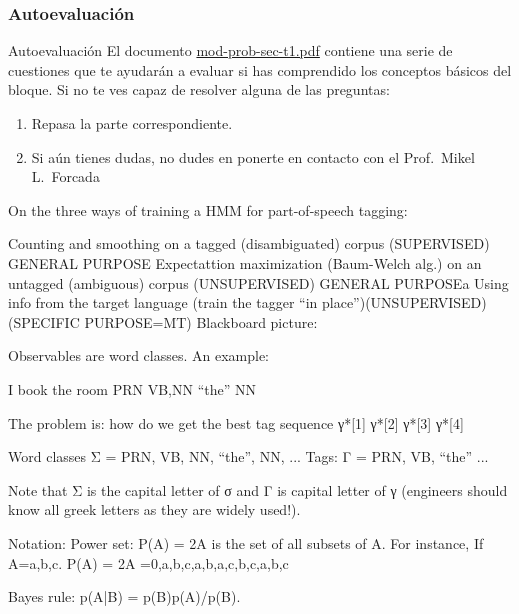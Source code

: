 \begin{frame}
\frametitle{Autoevaluación}

\begin{block}{Autoevaluación}
  El documento \url{mod-prob-sec-t1.pdf} contiene una serie de
  cuestiones que te ayudarán a evaluar si has comprendido los
  conceptos básicos del bloque. Si no te ves capaz de resolver alguna
  de las preguntas:
\begin{enumerate}
\item Repasa la parte correspondiente.
\item Si aún tienes dudas, no dudes en ponerte en contacto con el Prof.\ Mikel L.\ Forcada
\end{enumerate}
\end{block}

  
\end{frame}



















On the three ways of training a HMM for part-of-speech tagging:

Counting and smoothing on a tagged (disambiguated) corpus (SUPERVISED) GENERAL PURPOSE
Expectattion maximization (Baum-Welch alg.) on an untagged (ambiguous) corpus (UNSUPERVISED) GENERAL PURPOSEa
Using info from the target language (train the tagger “in place”)(UNSUPERVISED) (SPECIFIC PURPOSE=MT)
Blackboard picture:


Observables are word classes. An example:

I book the room
{PRN} {VB,NN} “the” {NN}

The problem is: how do we get the best tag sequence γ*[1] γ*[2] γ*[3] γ*[4]

Word classes Σ = { {PRN}, {VB, NN}, “the”, {NN}, ...}
Tags: Γ = { PRN, VB, “the” ...}

Note that Σ is the capital letter of σ and Γ is capital letter of γ (engineers should know all greek letters as they are widely used!).

Notation: Power set: P(A) = 2A  is the set of all subsets of A. For instance, If A={a,b,c}. P(A) = 2A ={0,{a},{b},{c},{a,b},{a,c},{b,c},{a,b,c}}

Bayes rule: p(A|B) = p(B)p(A)/p(B).


